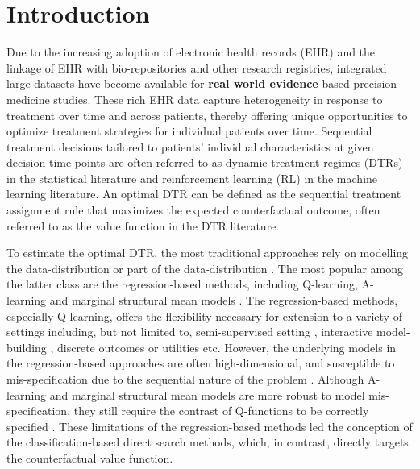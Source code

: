 \documentclass[preprint] {imsart}
\begin{document}
\begin{frontmatter}
\begin{abstract}
\end{abstract}
\date{\today}

\begin{keyword}
\end{keyword}
\end{frontmatter}

 \listoftodos[]


\section{Introduction}

Due to the increasing adoption of electronic health records (EHR) and 
the linkage of EHR with bio-repositories and other research
registries, integrated large datasets have become available for \textbf{real world evidence} based precision medicine studies. These rich EHR data capture heterogeneity in response to treatment over time and across patients, thereby offering unique opportunities to optimize treatment strategies for individual patients over time. Sequential treatment decisions tailored to patients' individual characteristics at given decision time points are often referred to as dynamic treatment regimes (DTRs) in the statistical literature and reinforcement learning (RL) in the machine learning literature. An optimal DTR can be defined as the sequential treatment assignment rule that maximizes the expected counterfactual outcome, often referred to as the value function in the DTR literature. 

To estimate the optimal DTR, the most traditional approaches rely on modelling the data-distribution  or part of the data-distribution \citep{xu2016, zajonc2012}. The most popular among the latter class are the regression-based methods, including Q-learning, A-learning and marginal structural mean models \citep[][]{Watkins1989, murphy2003, schulte2014, orellana2010, Robins2004}. The regression-based methods, especially Q-learning, offers the flexibility necessary for extension to a variety of settings including, but not limited to, semi-supervised setting \citep{sonabendw2021semisupervised}, interactive model-building \citep{laber2014}, discrete outcomes or utilities \citep{moodie2014} etc. However, %
the  underlying models in the regression-based approaches are often high-dimensional, and susceptible to mis-specification due to the sequential nature of the problem \citep{MurphySA2001MMMf}. Although A-learning and marginal structural mean models are more robust to model mis-specification, they still require the contrast of Q-functions to be correctly specified  \citep[cf.][]{schulte2014}. 
These limitations of the regression-based methods led the conception of the classification-based direct search methods, which, in contrast, directly targets  the counterfactual value function.
\end{document}

